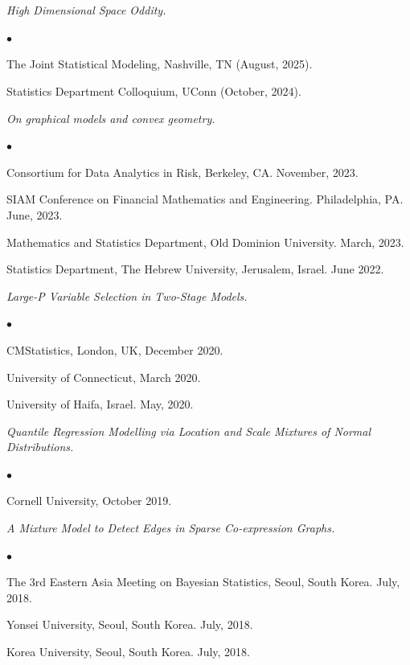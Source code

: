 \documentclass[12pt,a4paper]{article}
\newcommand{\headingfont}{\Large\color{OliveGreen}}
\newenvironment{list1}{
  \begin{list}{\ding{113}}{%
      \setlength{\itemsep}{0in}
      \setlength{\parsep}{0in} \setlength{\parskip}{0in}
      \setlength{\topsep}{0in} \setlength{\partopsep}{0in}
      \setlength{\leftmargin}{0.17in}}}{\end{list}}
\newenvironment{list2}{
  \begin{list}{$\bullet$}{%
      \setlength{\itemsep}{0in}
      \setlength{\parsep}{0in} \setlength{\parskip}{0in}
      \setlength{\topsep}{0in} \setlength{\partopsep}{0in}
      \setlength{\leftmargin}{0.2in}}}{\end{list}}
\begin{document}
\section*{\sc{\headingfont Invited Talks}}
\begin{list1}
\item[]\textit{High Dimensional Space Oddity.} 
\begin{list2}
\item[-] The Joint Statistical Modeling, Nashville, TN (August, 2025).
\item[-] Statistics Department Colloquium, UConn (October, 2024).
\end{list2}
\item[]\textit{On graphical models and convex geometry.}
\begin{list2}
\item[-] Consortium for Data Analytics in Risk, Berkeley, CA. November, 2023.
\item[-] SIAM Conference on Financial Mathematics and Engineering. Philadelphia, PA. June, 2023.
\item[-] Mathematics and Statistics Department, Old Dominion University. March, 2023.
\item[-] Statistics Department, The Hebrew University, Jerusalem, Israel. June 2022.
\end{list2}
\item[] \textit{Large-P Variable Selection in Two-Stage Models.}
\begin{list2}
\item[-] CMStatistics, London, UK,  December 2020.
\item[-] University of Connecticut, March 2020.
\item[-] University of Haifa, Israel. May, 2020.
\end{list2}
\item[] \textit{Quantile Regression Modelling via Location and
Scale Mixtures of Normal Distributions.}
\begin{list2}
\item[-] Cornell University, October 2019.
\end{list2}
\item[] \textit{A Mixture Model to Detect Edges in Sparse Co-expression Graphs.}
\begin{list2}
\item[-] The 3rd Eastern Asia Meeting on Bayesian Statistics, Seoul, South Korea. July, 2018.
\item[-] Yonsei University, Seoul, South Korea. July, 2018.
\item[-] Korea University, Seoul, South Korea. July, 2018.

\end{list2}
\end{list1}
\end{document}
